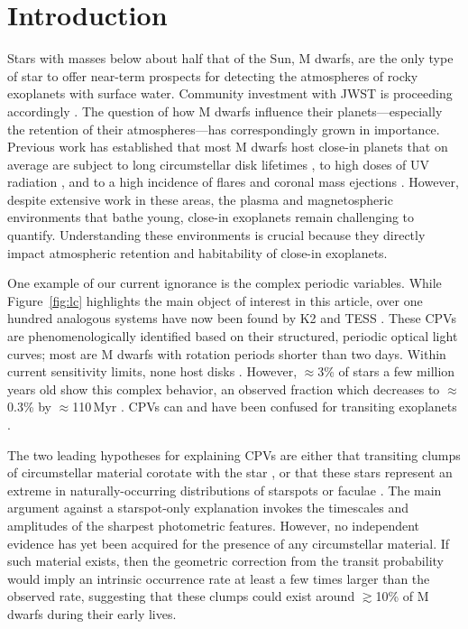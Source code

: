 \documentclass[11pt,twocolumn,tighten,linenumbers]{aastex7}
\begin{document}
\section{Introduction}
\label{sec:intro}

Stars with masses below about half that of the Sun, M dwarfs, are the
only type of star to offer near-term prospects for detecting the
atmospheres of rocky exoplanets with surface water.  Community
investment with JWST is proceeding accordingly
\citep[][]{Redfield2024,TRAPPIST1JWSTCommunityInitiative2024}.  The
question of how M dwarfs influence their planets---especially the
retention of their atmospheres---has correspondingly grown in
importance.  Previous work has established
that most M dwarfs host close-in planets \citep{Dressing2015} that on
average are subject to long circumstellar disk lifetimes
\citep{Ribas2015}, to high doses of UV radiation \citep{France2016},
and to a high incidence of flares and coronal mass ejections
\citep{Feinstein2020}.  However, despite extensive work in these
areas, the plasma and magnetospheric environments that bathe young,
close-in exoplanets remain challenging to quantify.  Understanding
these environments is crucial because they directly impact atmospheric
retention and habitability of close-in exoplanets.

One example of our current ignorance is the complex periodic
variables.  While Figure~\ref{fig:lc} highlights the main
object of interest in this article, over one hundred analogous systems
have now been found by K2 and TESS
\citep{Rebull2016,Stauffer2017,Rebull2018,Zhan2019,Rebull2020,Stauffer2021,Popinchalk2023,Bouma2024}.
These CPVs are phenomenologically identified based on their
structured, periodic optical light curves; most are M dwarfs with
rotation periods shorter than two days.  Within current sensitivity
limits, none host disks \citep{Stauffer2017,Bouma2024}.  However,
$\approx$3\% of stars a few million years old show this complex
behavior, an observed fraction which decreases to
$\approx$0.3\% by $\approx$110\,Myr \citep{Rebull2020}.  CPVs can and
have been confused for transiting exoplanets
\citep{vanEyken2012,Johns-Krull2016,Bouma2020}.

The two leading hypotheses for explaining CPVs are either that
transiting clumps of circumstellar material corotate with the star
\citep{Stauffer2017,Gunther2022,Bouma2024}, or that these stars
represent an extreme in naturally-occurring distributions of starspots
or faculae \citep{Koen2021}.  The main argument against a
starspot-only explanation invokes the timescales and amplitudes of the
sharpest photometric features.  However, no independent evidence has
yet been acquired for the presence of any circumstellar material.  If
such material exists, then the geometric correction from the transit
probability would imply an intrinsic occurrence rate at least a few
times larger than the observed rate, suggesting that these clumps
could exist around $\gtrsim$10\% of M dwarfs during their early lives.
\end{document}

